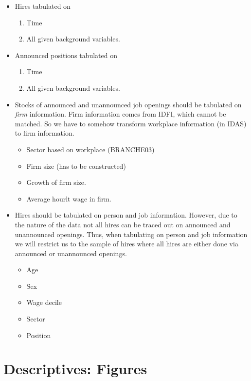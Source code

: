 \documentclass{article}
\begin{document}
\begin{itemize}

\item Hires tabulated on
\begin{enumerate}
\item Time
\item All given background variables.
\end{enumerate}

\item Announced positions tabulated on
\begin{enumerate}
\item Time
\item All given background variables.
\end{enumerate}


\item Stocks of announced and unannounced job openings should be tabulated on \emph{firm} information. Firm information comes from IDFI, which cannot be matched. So we have to somehow transform workplace information (in IDAS) to firm information. 

\begin{itemize}
\item Sector based on workplace (BRANCHE03)
\item Firm size (has to be constructed)
\item Growth of firm size.
\item Average hourlt wage in firm.
\end{itemize}


\item Hires should be tabulated on person and job information. However, due to the nature of the data not all hires can be traced out on announced and unannounced openings. Thus, when tabulating on person and job information we will restrict us to the sample of hires where all hires are either done via announced or unannounced openings.

	\begin{itemize}
		\item Age
		\item Sex
		\item Wage decile
		\item Sector
		\item Position
	\end{itemize} 

\end{itemize}

\section{Descriptives: Figures}
\end{document}
